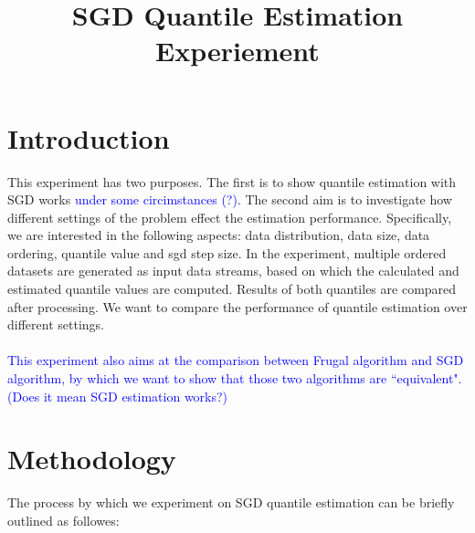 \documentclass[12pt]{article}
\title{SGD Quantile Estimation Experiement}
\date{\vspace{-5ex}}
\begin{document}
\maketitle

\section{Introduction}

This experiment has two purposes. The first is to show quantile estimation with SGD works \textcolor{blue}{ under some circimstances (?)}.
The second aim is to investigate how different settings of the problem effect the estimation performance. Specifically, we are interested in the following aspects: data distribution, data size, data ordering, quantile value and sgd step size.
In the experiment, multiple ordered datasets are generated as input data streams, based on which the calculated and estimated quantile values are computed. Results of both quantiles are compared after processing. We want to compare the performance of quantile estimation over different settings.
\\\\
\textcolor{blue}{This experiment also aims at the comparison between Frugal algorithm and SGD algorithm, by which we want to show that those two algorithms are ``equivalent". 
\\
(Does it mean SGD estimation works?)}


\section{Methodology}
The process by which we experiment on SGD quantile estimation can be briefly outlined as followes:
\end{document}
